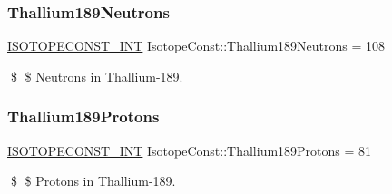 \subsubsection{\texorpdfstring{Thallium189\+Neutrons}{Thallium189Neutrons}}
{\footnotesize\ttfamily \mbox{\hyperlink{group___isotope_const-_macros_ga5f18360b3e99483a35c32d789e62621c}{I\+S\+O\+T\+O\+P\+E\+C\+O\+N\+S\+T\+\_\+\+I\+NT}} Isotope\+Const\+::\+Thallium189\+Neutrons = 108}

\$ \$ Neutrons in Thallium-\/189. \mbox{\label{group___isotope_const-_thallium-_tl189_ga1773d83e0088883eaefddce29a97cbbf}} 
\subsubsection{\texorpdfstring{Thallium189\+Protons}{Thallium189Protons}}
{\footnotesize\ttfamily \mbox{\hyperlink{group___isotope_const-_macros_ga5f18360b3e99483a35c32d789e62621c}{I\+S\+O\+T\+O\+P\+E\+C\+O\+N\+S\+T\+\_\+\+I\+NT}} Isotope\+Const\+::\+Thallium189\+Protons = 81}

\$ \$ Protons in Thallium-\/189. 